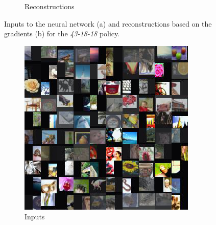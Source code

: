 \begin{figure}[hbt!]
\begin{subfigure}{.49\linewidth}
\caption{Reconstructions}%
\end{subfigure}%
\caption{Inputs to the neural network (a) and reconstructions based on the gradients (b) for the \textit{43-18-18} policy.}
    \label{fig:apprr6}
\end{figure}


\begin{figure}[hbt!]
\begin{subfigure}{.49\linewidth}\centering
\includegraphics[width=\textwidth]{grids/data_cifar100_arch_ResNet20-4_epoch_200_optim_inversed_mode_aug_auglist_3-1-7+43-18-18_rlabel_False_reaugment_translate_clipped3_ORIGINALS.png}
\caption{Inputs}%
\end{subfigure}%
\hfill
\begin{subfigure}{.49\linewidth}\centering

\end{subfigure}
\end{figure}
